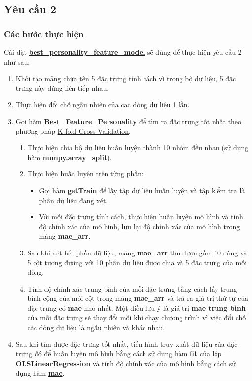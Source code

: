\documentclass{report}
\begin{document}
    \subsection{Yêu cầu 2}
        \subsubsection{Các bước thực hiện}
        Cài đặt \hyperref[sec:bestpersonalityfeaturemodel]{\textbf{best\_personality\_feature\_model}} sẽ dùng để thực hiện yêu cầu 2 như sau:
            \begin{enumerate}
                \item Khởi tạo mảng chứa tên 5 đặc trưng tính cách vì trong bộ dữ liệu, 5 đặc trưng này đứng liên tiếp nhau.
                \item Thực hiện đổi chỗ ngẫu nhiên của cac dòng dữ liệu 1 lần.
                \item Gọi hàm \hyperref[sec:BestFeaturePersonality]{\textbf{Best\_Feature\_Personality}}  để tìm ra đặc trưng tốt nhất theo phương pháp \hyperref[sec:k-fold-cross-validation]{K-fold Cross Validation}.
                \begin{enumerate}
                    \item Thực hiện chia bộ dữ liệu huấn luyện thành 10 nhóm đều nhau (sử dụng hàm \textbf{numpy.array\_split}).
                    \item Thực hiện huấn luyện trên từng phần:
                        \begin{itemize}
                            \item Gọi hàm \hyperref[sec:getTrain]{\textbf{getTrain}} để lấy tập dữ liệu huấn luyện và tập kiểm tra là phần dữ liệu đang xét.
                            \item Với mỗi đặc trưng tính cách, thực hiện huấn luyện mô hình và tính độ chính xác của mô hình, lưu lại độ chính xác của mô hình trong mảng \textbf{mae\_arr}.
                        \end{itemize}
                    \item Sau khi xét hết phần dữ liệu, mảng \textbf{mae\_arr} thu được gồm 10 dòng và 5 cột tương đương với 10 phần dữ liệu được chia và 5 đặc trưng của mỗi dòng.
                    \item Tính độ chính xác trung bình của mỗi đặc trưng bằng cách lấy trung bình cộng của mỗi cột trong mảng \textbf{mae\_arr} và trả ra giá trị thứ tự của đặc trưng có \textbf{mae} nhỏ nhất. Một điều lưu ý là giá trị \textbf{mae trung bình} của mỗi đặc trưng sẽ thay đổi mỗi khi chạy chương trình vì việc đổi chỗ các dòng dữ liệu là ngẫu nhiên và khác nhau. 
                \end{enumerate}
                \item Sau khi tìm được đặc trưng tốt nhất, tiến hình truy xuất dữ liệu của đặc trưng đó để huấn luyện mô hình bằng cách sử dụng hàm \textbf{fit} của lớp \hyperref[sec:olslinearregression]{\textbf{OLSLinearRegression}}  và tính độ chính xác của mô hình bằng cách sử dụng hàm \hyperref[sec:mae]{\textbf{mae}}.
            \end{enumerate}
        
\end{document}

